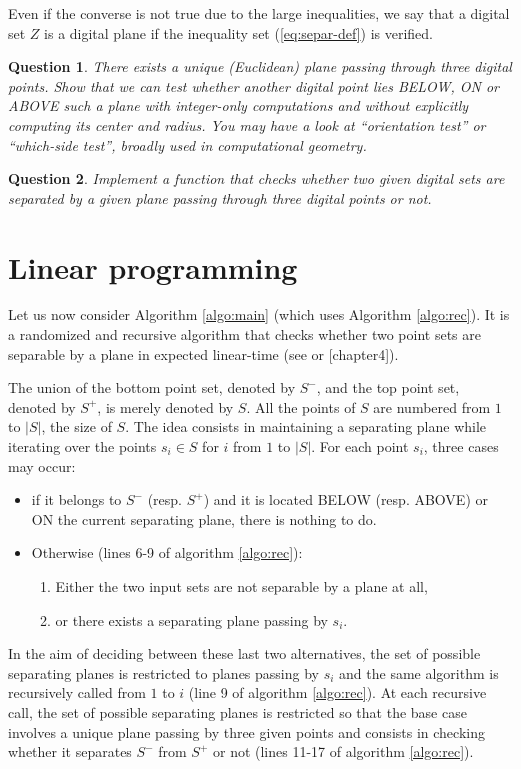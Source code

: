 \documentclass[a4paper, 11pt]{article}
\newtheorem{qu}{Question}
\begin{document}
Even if the converse is not true due to the large inequalities, we say that a digital set $Z$ is 
a digital plane if the inequality set (\ref{eq:separ-def}) is verified.

\begin{qu}
There exists a unique (Euclidean) plane passing through three digital points. Show that we can test whether another digital
point lies BELOW, ON or ABOVE such a plane with integer-only computations and without explicitly computing 
its center and radius. You may have a look at ``orientation test'' or ``which-side test'', broadly used in computational geometry. 
\end{qu}

\begin{qu}
Implement a function that checks whether two given digital sets are separated by a given plane passing through three
digital points or not.  
\end{qu}

\section{Linear programming}

Let us now consider Algorithm \ref{algo:main} (which uses Algorithm \ref{algo:rec}). 
It is a randomized and recursive algorithm that checks whether two point sets
 are separable by a plane in expected linear-time (see \cite{Seidel1991} or \cite{Berg2000}[chapter4]). 

The union of the bottom point set, denoted by $S^-$, and the top point set, denoted by $S^+$, is 
merely denoted by $S$. All the points of $S$ are numbered from $1$ to $|S|$, the size of $S$.    
The idea consists in maintaining a separating plane while iterating over the points $s_i \in S$ 
for $i$ from $1$ to $|S|$. 
For each point $s_i$, three cases may occur:  
\begin{itemize}
 \item if it belongs to $S^-$ (resp. $S^+$) and it is located BELOW (resp. ABOVE) or ON 
the current separating plane, there is nothing to do. 
 \item Otherwise (lines 6-9 of algorithm \ref{algo:rec}): 
 \begin{enumerate}
   \item Either the two input sets are not separable by a plane at all,  
   \item or there exists a separating plane passing by $s_i$. 
 \end{enumerate}
\end{itemize}
In the aim of deciding between these last two alternatives, the set of possible separating 
planes is restricted to planes passing by $s_i$ and the same algorithm is recursively called
from $1$ to $i$ (line 9 of algorithm \ref{algo:rec}). 
At each recursive call, the set of possible separating planes is restricted so that the base case 
involves a unique plane passing by three given points and consists in checking whether it separates 
$S^-$ from $S^+$ or not (lines 11-17 of algorithm \ref{algo:rec}).  
\end{document}
